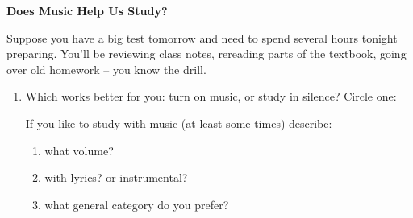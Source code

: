 \def\theTopic{ Music for Studying }
\def\dayNum{10}


\begin{center}
\vspace*{.1in}
{\bf {\large Does Music Help Us Study?}}\\
\end{center}
\vspace{-.1in}


Suppose you have a big test tomorrow and need to spend several hours
tonight preparing.  You'll be reviewing class notes, rereading  parts
of the textbook, going over old homework -- you know the drill.
\begin{enumerate}
\item  Which works better for you: turn on music, or study in silence? 
  Circle one:
  If you like to study with music (at least some times) describe:
  \begin{enumerate}
  \item what volume?\\
  \item with lyrics? or instrumental?\\
  \item what general category do you prefer?\\
  \end{enumerate}


\end{enumerate}
